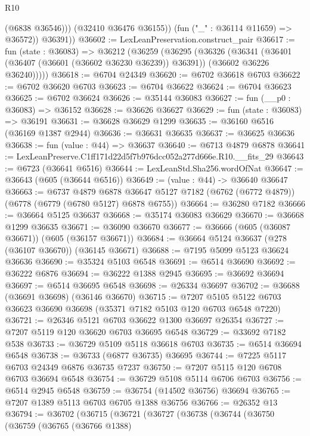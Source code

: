 \begin{lexlean}{R10}
\begin{coremodule}
                (@6838 @36546)))
            (@32410 @36476 @36155))
          (fun ("_" : @36114 @11659) => @36572))
        @36391))
@36602 := LexLeanPreservation.construct_pair
@36617 := fun (state : @36083) =>
  @36212
    (@36259
      (@36295
        (@36326
          (@36341
            (@36401 (@36407 (@36601 (@36602 @36230 @36239)) @36391))
            (@36602 @36226 @36240)))))
@36618 := @6704 @24349
@36620 := @6702 @36618 @6703
@36622 := @6702 @36620 @6703
@36623 := @6704 @36622
@36624 := @6704 @36623
@36625 := @6702 @36624
@36626 := @35144 @36083
@36627 := fun (__p0 : @36083) => @36152
@36628 := @36626 @36627
@36629 := fun (state : @36083) => @36191
@36631 := @36628 @36629 @1299
@36635 := @36160 @6516 (@36169 @1387 @2944)
@36636 := @36631 @36635
@36637 := @36625 @36636
@36638 := fun (value : @44) => @36637
@36640 := @6713 @4879 @6878
@36641 := LexLeanPreserve.C1ff171d22d5f7b976dcc052a277d666e.R10.__fits_29
@36643 := @6723 (@36641 @6516)
@36644 := LexLeanStd.Sha256.wordOfNat
@36647 := @36643 (@605 (@36644 @6516))
@36649 := (value : @44) -> @36640 @36647
@36663 := @6737
    @4879
    @6878
    @36647
    @5127
    @7182
    (@6762 (@6772 @4879))
    (@6778 (@6779 (@6780 @5127) @6878 @6755))
@36664 := @36280 @7182
@36666 := @36664 @5125 @36637
@36668 := @35174 @36083 @36629
@36670 := @36668 @1299 @36635
@36671 := @36090 @36670
@36677 := @36666 (@605 (@36087 @36671)) (@605 (@36157 @36671))
@36684 := @36664 @5124 @36637 (@278 (@36107 @36670)) (@36145 @36671)
@36688 := @7195 @5099 @5123 @36624 @36636
@36690 := @35324 @5103 @6548
@36691 := @6514 @36690
@36692 := @36222 @6876
@36694 := @36222 @1388 @2945
@36695 := @36692 @36694
@36697 := @6514 @36695 @6548
@36698 := @26334 @36697
@36702 := @36688 (@36691 @36698) (@36146 @36670)
@36715 := @7207 @5105 @5122 @6703 @36623 @36690 @36698 (@35371 @7182 @5103 @120 @6703 @6548 @7220)
@36721 := @26346 @5121 @6703 @36622 @1300 @36697 @26354
@36727 := @7207 @5119 @120 @36620 @6703 @36695 @6548
@36729 := @33692 @7182 @538
@36733 := @36729 @5109 @5118 @36618 @6703
@36735 := @6514 @36694 @6548
@36738 := @36733 (@6877 @36735) @36695
@36744 := @7225 @5117 @6703 @24349 @6876 @36735 @7237
@36750 := @7207 @5115 @120 @6708 @6703 @36694 @6548
@36754 := @36729 @5108 @5114 @6706 @6703
@36756 := @6514 @2945 @6548
@36759 := @36754 (@14502 @36756) @36694
@36765 := @7207 @1389 @5113 @6703 @6705 @1388 @36756
@36766 := @26352 @13
@36794 := @36702
    (@36715
      (@36721
        (@36727
          (@36738
            (@36744
              (@36750
                (@36759
                  (@36765
                    (@36766 @1388)

\end{coremodule}
\end{lexlean}
